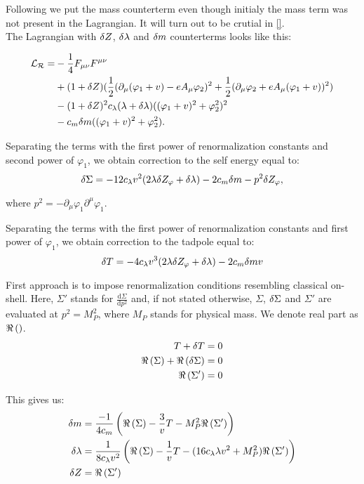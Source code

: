 Following \cite{Coleman1973} we put the mass counterterm even though initialy the mass term 
was not present in the Lagrangian. It will turn out to be crutial in \ref{}. \\ 
The Lagrangian with $\delta Z$, $\delta\lambda$ and $\delta m$ counterterms looks like this:

\begin{align}
\mathcal{L_R} = &-\frac{1}{4}F_{\mu\nu}F^{\mu\nu} \\
&+(1+ \delta Z)(\frac{1}{2}(\partial_\mu(\varphi_1+v) - eA_\mu\varphi_2)^2
+\frac{1}{2}(\partial_\mu\varphi_2+eA_\mu(\varphi_1+v))^2) \notag \\
&-(1+\delta Z)^2c_\lambda(\lambda+\delta\lambda)((\varphi_1+v)^2+\varphi_2^2)^2  \notag \\
&-c_m\delta m((\varphi_1+v)^2+\varphi_2^2).
\end{align}


Separating the terms with the first power of renormalization constants and second power of 
$\varphi_1$, we obtain correction to the self energy equal to:
\begin{equation}
\delta\Sigma=-12c_\lambda v^2(2\lambda\delta Z_\varphi+\delta\lambda)-2c_m\delta m-p^2\delta Z_\varphi,
\end{equation}

where $p^2 = -\partial_\mu \varphi_1\partial^\mu\varphi_1$.


Separating the terms with the first power of renormalization constants and first power of 
$\varphi_1$, we obtain correction to the tadpole equal to:
\begin{equation}
\delta T=-4c_\lambda v^3(2\lambda\delta Z_\varphi+\delta\lambda)-2c_m\delta m v
\end{equation}



First approach is to impose renormalization conditions resembling classical on-shell.
Here, $\Sigma'$ stands for $\frac{\textrm{d}\Sigma}{\textrm{d}p^2}$ and, if not 
stated otherwise, 
$\Sigma$, $\delta\Sigma$ and $\Sigma'$ are evaluated at $p^2 = M_P^2$, where 
$M_P$ stands for physical mass. We denote real part as $\Re\left(\right)$.
\begin{align}
T+\delta T &= 0 \\
\Re\left(\Sigma\right) + \Re\left(\delta\Sigma\right) &= 0 \\
\Re\left(\Sigma'\right) &= 0
\end{align}

This gives us:
\begin{align}
\delta m &= \frac{-1}{4c_m}\left(\Re\left(\Sigma\right)-\frac{3}{v}T-M_P^2\Re\left(\Sigma'\right)
\right)\\
\delta\lambda &= \frac{1}{8c_\lambda v^2}\left(\Re\left(\Sigma\right)-\frac{1}{v}T-(16c_\lambda\lambda v^2+M_P^2)
\Re\left(\Sigma'\right)
\right)\\
\delta Z &= \Re\left(\Sigma'\right)
\end{align}

